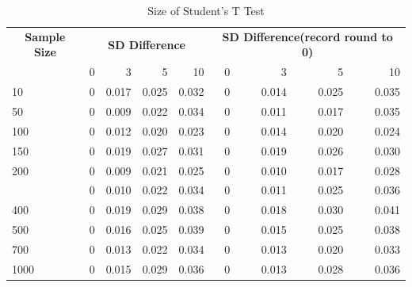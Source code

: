 \documentclass[]{article}
\begin{document}
\begin{longtable}[t]{lrrrrrrrr}
\caption{\label{tab:size-tables}Size of Student's T Test}\\
\toprule
\multicolumn{1}{c}{\bfseries Sample Size} & \multicolumn{4}{c}{\bfseries SD Difference} & \multicolumn{4}{c}{\bfseries SD Difference(record round to 0)} \\
\cmidrule(l{2pt}r{2pt}){1-1} \cmidrule(l{2pt}r{2pt}){2-5} \cmidrule(l{2pt}r{2pt}){6-9}
  & 0 & 3 & 5 & 10 & 0 & 3 & 5 & 10\\
\midrule
10 & 0 & 0.017 & 0.025 & 0.032 & 0 & 0.014 & 0.025 & 0.035\\
50 & 0 & 0.009 & 0.022 & 0.034 & 0 & 0.011 & 0.017 & 0.035\\
100 & 0 & 0.012 & 0.020 & 0.023 & 0 & 0.014 & 0.020 & 0.024\\
150 & 0 & 0.019 & 0.027 & 0.031 & 0 & 0.019 & 0.026 & 0.030\\
200 & 0 & 0.009 & 0.021 & 0.025 & 0 & 0.010 & 0.017 & 0.028\\
\addlinespace
300 & 0 & 0.010 & 0.022 & 0.034 & 0 & 0.011 & 0.025 & 0.036\\
400 & 0 & 0.019 & 0.029 & 0.038 & 0 & 0.018 & 0.030 & 0.041\\
500 & 0 & 0.016 & 0.025 & 0.039 & 0 & 0.015 & 0.025 & 0.038\\
700 & 0 & 0.013 & 0.022 & 0.034 & 0 & 0.013 & 0.020 & 0.033\\
1000 & 0 & 0.015 & 0.029 & 0.036 & 0 & 0.013 & 0.028 & 0.036\\
\bottomrule
\end{longtable}
\end{document}

